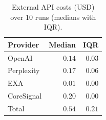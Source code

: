 \begin{table}[H]
\centering
\small
\caption{External API costs (USD) over 10 runs (medians with IQR).}
\label{tab:costs}
\begin{tabular}{lrr}\toprule
Provider & Median & IQR \\ \midrule
OpenAI & $0.14$ & $0.03$ \\ 
Perplexity & $0.17$ & $0.06$ \\ 
EXA & $0.01$ & $0.00$ \\ 
CoreSignal & $0.20$ & $0.00$ \\ 
\midrule
Total & $0.54$ & $0.21$ \\ 
\bottomrule\end{tabular}\end{table}
